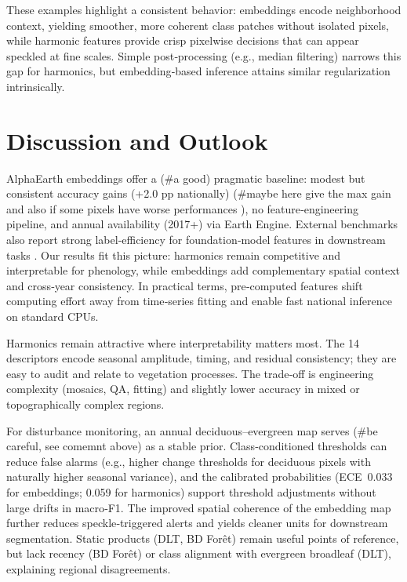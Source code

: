 \documentclass[utf8]{FrontiersinHarvard}
\begin{document}
These examples highlight a consistent behavior: embeddings encode neighborhood context, yielding smoother, more coherent class patches without isolated pixels, while harmonic features provide crisp pixelwise decisions that can appear speckled at fine scales. Simple post‑processing (e.g., median filtering) narrows this gap for harmonics, but embedding‑based inference attains similar regularization intrinsically.


\section{Discussion and Outlook}

AlphaEarth embeddings \citep{AlphaEarth2025} offer a (#a good) pragmatic baseline: modest but consistent accuracy gains (+2.0 pp nationally) (#maybe here give the max gain and also if some pixels have worse performances ), no feature‑engineering pipeline, and annual availability (2017+) via Earth Engine. External benchmarks also report strong label‑efficiency for foundation‑model features in downstream tasks \citep{Dionelis2024BenchmarkFM}. Our results fit this picture: harmonics remain competitive and interpretable for phenology, while embeddings add complementary spatial context and cross‑year consistency. In practical terms, pre‑computed features shift computing effort away from time‑series fitting and enable fast national inference on standard CPUs.

Harmonics remain attractive where interpretability matters most. The 14 descriptors encode seasonal amplitude, timing, and residual consistency; they are easy to audit and relate to vegetation processes. The trade‑off is engineering complexity (mosaics, QA, fitting) and slightly lower accuracy in mixed or topographically complex regions.

For disturbance monitoring, an annual deciduous–evergreen map serves (#be careful, see comemnt above) as a stable prior. Class‑conditioned thresholds can reduce false alarms (e.g., higher change thresholds for deciduous pixels with naturally higher seasonal variance), and the calibrated probabilities (ECE~0.033 for embeddings; 0.059 for harmonics) support threshold adjustments without large drifts in macro‑F1. The improved spatial coherence of the embedding map further reduces speckle‑triggered alerts and yields cleaner units for downstream segmentation. Static products (DLT, BD Forêt) remain useful points of reference, but lack recency (BD Forêt) or class alignment with evergreen broadleaf (DLT), explaining regional disagreements.
\end{document}
